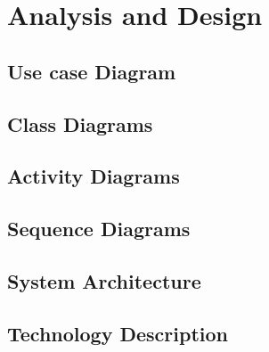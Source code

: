 \documentclass[../Report.tex]{subfiles}
\begin{document}
\chapter{Analysis and Design}

\section{Use case Diagram}

\section{Class Diagrams}

\section{Activity Diagrams}

\section{Sequence Diagrams}

\section{System Architecture}

\section{Technology Description}
\end{document}
